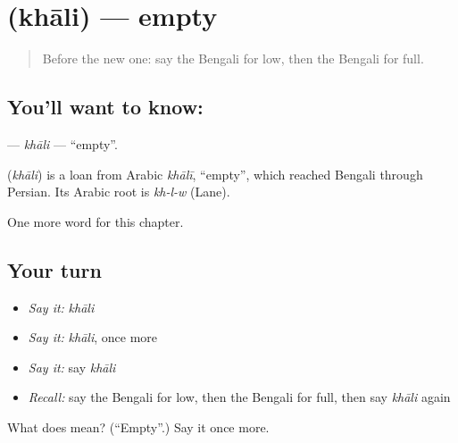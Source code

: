 \section[\texorpdfstring{\bn{খালি} (khāli)}{খালি (khāli)}]{ (khāli) — empty}

\label{lesson:BN-C74-khali}



\begin{quote}
Before the new one: say the Bengali for low, then the Bengali for full.
\end{quote}

\subsection*{You'll want to know: }
\textbf{} — \emph{khāli} — \textquotedblleft{}empty\textquotedblright{}.

\begin{cousinweb}
\textbf{} (\emph{khāli}) is a loan from Arabic \emph{khālī}, \textquotedblleft{}empty\textquotedblright{}, which reached Bengali through Persian. Its Arabic root is \emph{kh-l-w} (Lane).
\end{cousinweb}

\begin{grammarlens}[title={What you've built}]
One more word for this chapter.
\end{grammarlens}

\subsection*{Your turn}
\begin{itemize}
\raggedright
  \item \emph{Say it:} \emph{khāli}
  \item \emph{Say it:} \emph{khāli}, once more
  \item \emph{Say it:} say \emph{khāli}
  \item \emph{Recall:} say the Bengali for low, then the Bengali for full, then say \emph{khāli} again
\end{itemize}

\begin{tcolorbox}[breakable,colback=teal!4,colframe=teal!35!black,title={Before you move on}]
What does  mean? (\textquotedblleft{}Empty\textquotedblright{}.) Say it once more.
\end{tcolorbox}
